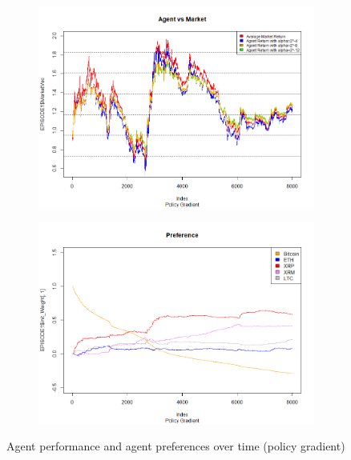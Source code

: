 \documentclass[a4paper,12pt]{article}
\begin{document}
\begin{figure}[h!]
  \centering
  \begin{subfigure}[b]{0.4\linewidth}
    \includegraphics[width=\linewidth]{figures/agt_vs_mkt_pg.png}
  \end{subfigure}
  \begin{subfigure}[b]{0.4\linewidth}
    \includegraphics[width=\linewidth]{figures/prefs_pg.png}
  \end{subfigure}
  \caption{Agent performance and agent preferences over time (policy gradient)}
  \label{fig:pg}
\end{figure}
\end{document}
